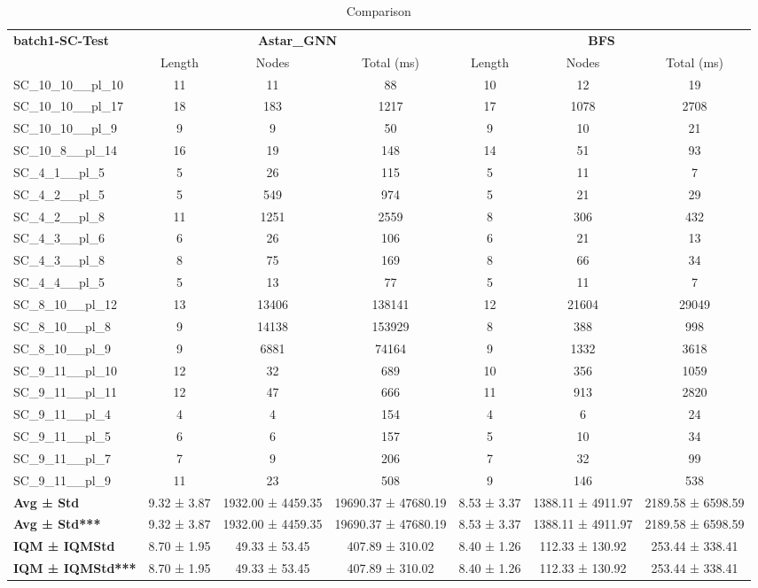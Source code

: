 \begin{table}[!ht]
\centering
\small
\begin{tabular}{l|ccc|ccc}
\multirow{2}{*}{\textbf{batch1-SC-Test}} & \multicolumn{3}{c|}{\textbf{Astar\_GNN}} & \multicolumn{3}{c}{\textbf{BFS}} \\
\cline{2-7}
& Length & Nodes & Total (ms) & Length & Nodes & Total (ms) \\
\hline
SC\_10\_10\_\_pl\_10 & 11 & 11 & 88 & 10 & 12 & 19 \\
SC\_10\_10\_\_pl\_17 & 18 & 183 & 1217 & 17 & 1078 & 2708 \\
SC\_10\_10\_\_pl\_9 & 9 & 9 & 50 & 9 & 10 & 21 \\
SC\_10\_8\_\_pl\_14 & 16 & 19 & 148 & 14 & 51 & 93 \\
SC\_4\_1\_\_pl\_5 & 5 & 26 & 115 & 5 & 11 & 7 \\
SC\_4\_2\_\_pl\_5 & 5 & 549 & 974 & 5 & 21 & 29 \\
SC\_4\_2\_\_pl\_8 & 11 & 1251 & 2559 & 8 & 306 & 432 \\
SC\_4\_3\_\_pl\_6 & 6 & 26 & 106 & 6 & 21 & 13 \\
SC\_4\_3\_\_pl\_8 & 8 & 75 & 169 & 8 & 66 & 34 \\
SC\_4\_4\_\_pl\_5 & 5 & 13 & 77 & 5 & 11 & 7 \\
SC\_8\_10\_\_pl\_12 & 13 & 13406 & 138141 & 12 & 21604 & 29049 \\
SC\_8\_10\_\_pl\_8 & 9 & 14138 & 153929 & 8 & 388 & 998 \\
SC\_8\_10\_\_pl\_9 & 9 & 6881 & 74164 & 9 & 1332 & 3618 \\
SC\_9\_11\_\_pl\_10 & 12 & 32 & 689 & 10 & 356 & 1059 \\
SC\_9\_11\_\_pl\_11 & 12 & 47 & 666 & 11 & 913 & 2820 \\
SC\_9\_11\_\_pl\_4 & 4 & 4 & 154 & 4 & 6 & 24 \\
SC\_9\_11\_\_pl\_5 & 6 & 6 & 157 & 5 & 10 & 34 \\
SC\_9\_11\_\_pl\_7 & 7 & 9 & 206 & 7 & 32 & 99 \\
SC\_9\_11\_\_pl\_9 & 11 & 23 & 508 & 9 & 146 & 538 \\
\hline
\textbf{Avg ± Std} & 9.32 ± 3.87 & 1932.00 ± 4459.35 & 19690.37 ± 47680.19 & 8.53 ± 3.37 & 1388.11 ± 4911.97 & 2189.58 ± 6598.59 \\
\textbf{Avg ± Std***} & 9.32 ± 3.87 & 1932.00 ± 4459.35 & 19690.37 ± 47680.19 & 8.53 ± 3.37 & 1388.11 ± 4911.97 & 2189.58 ± 6598.59 \\
\textbf{IQM ± IQMStd} & 8.70 ± 1.95 & 49.33 ± 53.45 & 407.89 ± 310.02 & 8.40 ± 1.26 & 112.33 ± 130.92 & 253.44 ± 338.41 \\
\textbf{IQM ± IQMStd***} & 8.70 ± 1.95 & 49.33 ± 53.45 & 407.89 ± 310.02 & 8.40 ± 1.26 & 112.33 ± 130.92 & 253.44 ± 338.41 \\
\end{tabular}
\caption{Comparison}
\label{tab:batch1_SC_comparison_test}
\end{table}
